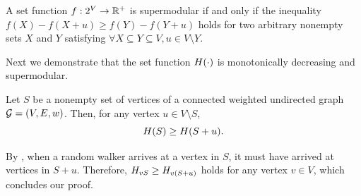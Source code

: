 \documentclass[10pt,twocolumn,twoside]{IEEEtran}
\begin{document}
\begin{definition}[Supermodularity]
    A set function \(f:2^{V}\to\mathbb{R}^+\) is  supermodular if and only if the inequality \(f(X)-f(X+u)\ge f(Y)-f(Y+u)\) holds for two arbitrary nonempty sets \(X\) and \(Y\) satisfying \(\forall X\subseteq Y\subseteq V, u\in V\setminus Y\).
\end{definition}

Next we demonstrate that the set function \(H(\cdot)\) is  monotonically decreasing and supermodular.

\begin{theorem}\label{thm:mono}
    Let \(S\) be a nonempty set of vertices of a connected weighted undirected graph \(\mathcal{G}=(V,E,w)\). Then, for any vertex \(u\in V\setminus S\),
    \begin{equation*}
        H(S)\ge H(S+u).
    \end{equation*}
\end{theorem}
\begin{IEEEproof}
    By , when a random walker arrives at a vertex in \(S\), it must have arrived at vertices in \(S+u\). Therefore, \(H_{vS}\ge H_{v\left( S+u \right)}\) holds for any vertex \(v\in V\), which concludes our proof.
\end{IEEEproof}
\end{document}
